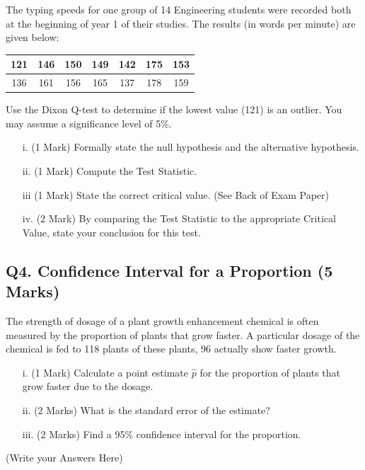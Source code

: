 \documentclass[a4paper,12pt]{article}
\begin{document}
The typing speeds for one group of 14 Engineering students were recorded both at the beginning of year 1 of their studies. The results (in words per minute) are given below:

\begin{center}
	\begin{tabular}{|c|c|c|c|c|c|c|}
		\hline
		121 & 146 & 150 &149 &142 &175& 153\\ \hline
		136 & 161 & 156& 165& 137& 178& 159
		\\ \hline
	\end{tabular}
\end{center}
Use the Dixon Q-test to determine if the lowest value (121) is an outlier. You may assume a significance level of 5\%.

\begin{itemize}
	\item[i.] (1 Mark) Formally state the null hypothesis and the alternative hypothesis.
	\item[ii.] (1 Mark) Compute the Test Statistic.
	\item[iii] (1 Mark) State the correct critical value. (See Back of Exam Paper)
	\item[iv.] (2 Mark) By comparing the Test Statistic to the appropriate Critical Value, state your conclusion for this test.
\end{itemize}
\newpage

\subsection*{Q4. Confidence Interval for a Proportion (5 Marks)}
The strength of dosage of a plant growth enhancement chemical is often measured by the proportion of plants that grow faster. A particular dosage of the chemical is fed to 118 plants of these plants, 96 actually show faster growth.

\begin{itemize}
	\item[i.] (1 Mark) Calculate a point estimate $\hat{p}$ for the proportion of plants that grow faster due to the dosage. 									 
	\item[ii.] (2 Marks)  What is the standard error of the estimate? 			
	\item[iii.] (2 Marks) Find a 95\% confidence interval for the proportion. 					
\end{itemize}
\newpage
(Write your Answers Here)
\newpage
\end{document}

